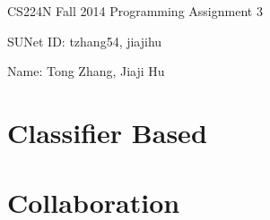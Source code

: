 \documentclass[12pt]{article}
\begin{document}
\begin{center}
{\Large CS224N Fall 2014 Programming Assignment 3}
\vspace{12pt}

SUNet ID: tzhang54, jiajihu

Name: Tong Zhang, Jiaji Hu
\vspace{12pt}
\end{center}

\section{Classifier Based}

\section{Collaboration} 
\end{document}
